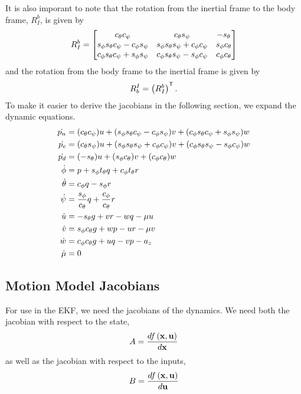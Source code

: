 \documentclass[a4paper]{article}
\begin{document}
It is also imporant to note that the rotation from the inertial frame to the
body frame, $R_I^b$, is given by
\begin{equation}
  R_I^b =
  \begin{bmatrix}
    c_\theta c_\psi & c_\theta s_\psi & -s_\theta \\
    s_\phi s_\theta c_\psi - c_\phi s_\psi & s_\phi s_\theta s_\psi + c_\phi
    c_\psi & s_\phi c_\theta \\
    c_\phi s_\theta c_\psi + s_\phi s_\psi & c_\phi s_\theta s_\psi - s_\phi
    c_\psi & c_\phi c_\theta
  \end{bmatrix}
\end{equation}
and the rotation from the body frame to the inertial frame is given by
\begin{equation}
  R_b^I = \left(R_I^b\right)^{\mathsf{T}}.
\end{equation}
To make it easier to derive the jacobians in the following section, we expand
the dynamic equations.
\begin{align}
  \dot{p_n} &= (c_\theta c_\psi)u + (s_\phi s_\theta c_\psi - c_\phi s_\psi)v +
    (c_\phi s_\theta c_\psi + s_\phi s_\psi)w \\
  \dot{p_e} &= (c_\theta s_\psi)u + (s_\phi s_\theta s_\psi + c_\phi c_\psi)v +
    (c_\phi s_\theta s_\psi - s_\phi c_\psi)w \\
  \dot{p_d} &= (-s_\theta)u + (s_\phi c_\theta)v + (c_\phi c_\theta)w \\
  \dot{\phi} &= p + s_\phi t_\theta q + c_\phi t_\theta r \\
  \dot{\theta} &= c_\phi q - s_\phi r \\
  \dot{\psi} &= \frac{s_\phi}{c_\theta} q + \frac{c_\phi}{c_\theta} r \\
  \dot{u} &= -s_\theta g + vr - wq - \mu u \\
  \dot{v} &= s_\phi c_\theta g + wp - ur - \mu v \\
  \dot{w} &= c_\phi c_\theta g + uq - vp - a_z \\
  \dot{\mu} &= 0
\end{align}

\subsection{Motion Model Jacobians}
For use in the EKF, we need the jacobians of the dynamics. We need both the
jacobian with respect to the state,
\begin{equation}
  A = \frac{d f\left(\boldsymbol{\mathrm{x}}, \boldsymbol{\mathrm{u}}\right)}{d \boldsymbol{\mathrm{x}}}
\end{equation}
as well as the jacobian with respect to the inputs,
\begin{equation}
  B = \frac{d f\left(\boldsymbol{\mathrm{x}}, \boldsymbol{\mathrm{u}}\right)}{d \boldsymbol{\mathrm{u}}}
\end{equation}
\end{document}
